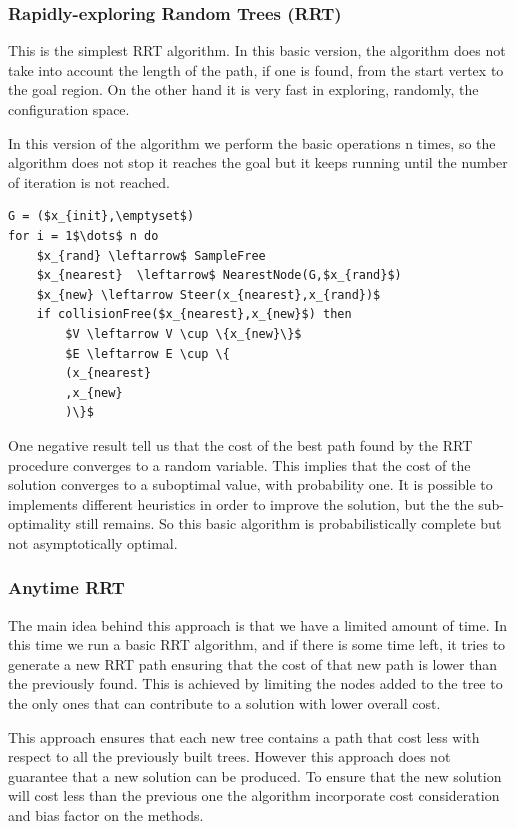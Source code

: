 \documentclass[10pt]{article}
\begin{document}
	\subsubsection{Rapidly-exploring Random Trees (RRT)}
	
	This is the simplest RRT algorithm. In this basic version, the algorithm does not take into account the length of the path, if one is found, from the start vertex to the goal region. On the other hand it is very fast in exploring, randomly, the configuration space.

	In this version of the algorithm we perform the basic operations n times, so the algorithm does not stop it reaches the goal but it keeps running until the number of iteration is not reached. 
	\begin{lstlisting}[frame=single, mathescape=true,caption={RRT}]
G = ($x_{init},\emptyset$)
for i = 1$\dots$ n do
	$x_{rand} \leftarrow$ SampleFree
	$x_{nearest}  \leftarrow$ NearestNode(G,$x_{rand}$)
	$x_{new} \leftarrow Steer(x_{nearest},x_{rand})$	
	if collisionFree($x_{nearest},x_{new}$) then
		$V \leftarrow V \cup \{x_{new}\}$
		$E \leftarrow E \cup \{
		(x_{nearest}
		,x_{new}
		)\}$
	\end{lstlisting}
	
	One negative result tell us that the cost of the best path found by the RRT procedure converges to a random variable. This implies that the cost of the solution converges to a suboptimal value, with probability one. It is possible to implements different heuristics in order to improve the solution, but the the sub-optimality still remains. So this basic algorithm is probabilistically complete but not asymptotically optimal.
	
	\subsubsection{Anytime RRT}
	
	The main idea behind this approach is that we have a limited amount of time. In this time we run a basic RRT algorithm, and if there is some time left, it tries to generate a new RRT path ensuring that the cost of that new path is lower than the previously found. This is achieved by limiting the nodes added to the tree to the only ones that can contribute to a solution with lower overall cost. 
	
	This approach ensures that each new tree contains a path that cost less with respect to all the previously built trees. However this approach does not guarantee that a new solution can be produced. To ensure that the new solution will cost less than the previous one the algorithm incorporate cost consideration and bias factor on the methods.
	
\end{document}
